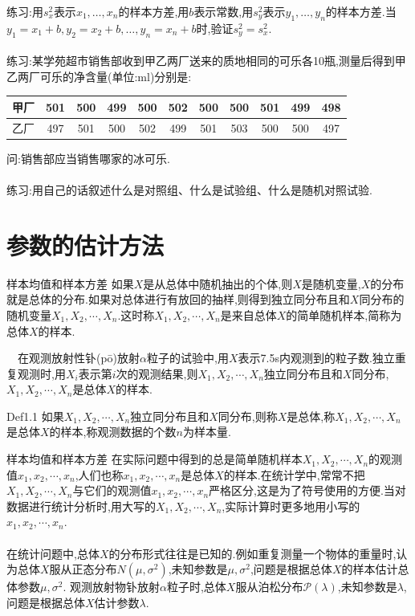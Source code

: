 	\begin{frame}
		练习:用$s_x^2$表示$x_1,\dots,x_n$的样本方差,用$b$表示常数,用$s_y^2$表示$y_1,\dots,y_n$的样本方差.当$y_1=x_1+b,y_2=x_2+b,\dots,y_n=x_n+b$时,验证$s_y^2 = s_x^2$.
		\\ \hspace*{\fill} \\%
		练习:某学苑超市销售部收到甲乙两厂送来的质地相同的可乐各10瓶,测量后得到甲乙两厂可乐的净含量(单位:ml)分别是:
		$\quad\quad\quad\quad$\begin{tabular}{|c|c|c|c|c|c|c|c|c|c|c|}
			\hline 甲厂 & 501 & 500 & 499 & 500 & 502 & 500 & 500 & 501 & 499 & 498 \\
			\hline 乙厂 & 497 & 501 & 500 & 502 & 499 & 501 & 503 & 500 & 500 & 497 \\
			\hline
		\end{tabular}
	
		问:销售部应当销售哪家的冰可乐.
		\\ \hspace*{\fill} \\%
		练习:用自己的话叙述什么是对照组、什么是试验组、什么是随机对照试验.
	\end{frame}
\section{参数的估计方法}
 \frame{\sectionpage}

	\begin{frame}{样本均值和样本方差}
		如果$X$是从总体中随机抽出的个体,则$X$是随机变量,$X$的分布就是总体的分布.如果对总体进行有放回的抽样,则得到独立同分布且和$X$同分布的随机变量$X_1,X_2,\cdots,X_n$.这时称$X_1,X_2,\cdots,X_n$是来自总体$X$的\alert{简单随机样本},简称为总体$X$的\alert{样本}.
		
		$\quad$在观测放射性钋(pō)放射$\alpha$粒子的试验中,用$X$表示7.5s内观测到的粒子数.独立重复观测时,用$X_i$表示第$i$次的观测结果,则$X_1,X_2,\cdots,X_n$独立同分布且和$X$同分布,$X_1,X_2,\cdots,X_n$是总体$X$的样本.
		
		Def1.1 如果$X_1,X_2,\cdots,X_n$独立同分布且和$X$同分布,则称$X$是总体,称$X_1,X_2,\cdots,X_n$是总体$X$的样本,称观测数据的个数$n$为样本量.
	\end{frame}

	\begin{frame}{样本均值和样本方差}
		在实际问题中得到的总是简单随机样本$X_1,X_2,\cdots,X_n$的观测值$x_1,x_2,\cdots,x_n$,人们也称$x_1,x_2,\cdots,x_n$是总体$X$的样本.在统计学中,常常不把$X_1,X_2,\cdots,X_n$与它们的观测值$x_1,x_2,\cdots,x_n$严格区分,这是为了符号使用的方便.当对数据进行统计分析时,用大写的$X_1,X_2,\cdots,X_n$,实际计算时更多地用小写的$x_1,x_2,\cdots,x_n$.
		\\ \hspace*{\fill} \\%
		在统计问题中,总体$X$的分布形式往往是已知的.例如重复测量一个物体的重量时,认为总体$X$服从正态分布$N(\mu,\sigma^2)$,未知参数是$\mu,\sigma^2$,问题是根据总体$X$的样本估计总体参数$\mu,\sigma^2$. 观测放射物钋放射$\alpha$粒子时,总体$X$服从泊松分布$\mathcal{P}(\lambda)$,未知参数是$\lambda$,问题是根据总体$X$估计参数$\lambda$.
	\end{frame}

